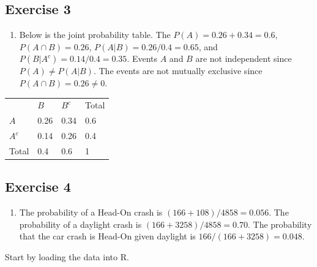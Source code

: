 \documentclass[
  letterpaper,
  DIV=11,
  numbers=noendperiod]{scrreprt}
\providecommand{\tightlist}{%
  \setlength{\itemsep}{0pt}\setlength{\parskip}{0pt}}\usepackage{longtable,booktabs,array}
\begin{document}
\hypertarget{exercise-3-15}{%
\subsection*{Exercise 3}\label{exercise-3-15}}

\begin{blackbox}

\begin{enumerate}
\def\labelenumi{\arabic{enumi}.}
\tightlist
\item
  Below is the joint probability table. The \(P(A)=0.26+0.34=0.6\),
  \(P(A \cap B)=0.26\), \(P(A|B)=0.26/0.4=0.65\), and
  \(P(B|A^c)=0.14/0.4=0.35\). Events \(A\) and \(B\) are not independent
  since \(P(A) \neq P(A|B)\). The events are not mutually exclusive
  since \(P(A \cap B)=0.26 \neq 0\).
\end{enumerate}

\end{blackbox}

\begin{longtable}[]{@{}llll@{}}
\toprule()
\endhead
& \(B\) & \(B^c\) & Total \\
\(A\) & 0.26 & 0.34 & 0.6 \\
\(A^c\) & 0.14 & 0.26 & 0.4 \\
Total & 0.4 & 0.6 & 1 \\
\bottomrule()
\end{longtable}

\hypertarget{exercise-4-5}{%
\subsection*{Exercise 4}\label{exercise-4-5}}

\begin{blackbox}

\begin{enumerate}
\def\labelenumi{\arabic{enumi}.}
\tightlist
\item
  The probability of a Head-On crash is \((166+108)/4858=0.056\). The
  probability of a daylight crash is \((166+3258)/4858=0.70\). The
  probability that the car crash is Head-On given daylight is
  \(166/(166+3258)=0.048\).
\end{enumerate}

\end{blackbox}

Start by loading the data into R.
\end{document}
